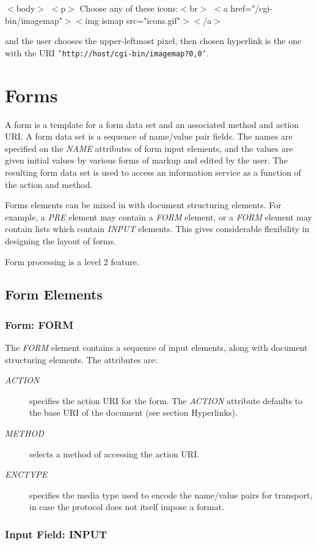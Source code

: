 $<$body$>$
$<$p$>$ Choose any of these icons:$<$br$>$
$<$a href="/cgi-bin/imagemap"$>$$<$img ismap src="icons.gif"$>$$<$/a$>$
\par 
and the user chooses the upper-leftmost pixel, then chosen
hyperlink is the one with the URI
{\tt `http://host/cgi-bin/imagemap?0,0'}.
\par \section*{Forms}\par 
A form is a template for a form data set and an associated method
and action URI.  A form data set is a sequence of name/value pair
fields.  The names are specified on the {\it NAME} attributes of form
input elements, and the values are given initial values by various
forms of markup and edited by the user.  The resulting form data set is
used to access an information service as a function of the action and
method.
\par \par 
Forms elements can be mixed in with document structuring
elements.  For example, a {\it PRE} element may contain a {\it FORM}
element, or a {\it FORM} element may contain lists which contain
{\it INPUT} elements.  This gives considerable flexibility in
designing the layout of forms.
\par \par 
Form processing is a level 2 feature.
\par \subsection*{Form Elements}\subsubsection*{Form:  FORM}\par 
The {\it FORM} element contains a sequence of input elements, along
with document structuring elements.  The attributes are:
\par \begin{description}\item[{\it ACTION}]
specifies the action URI for the form.  The {\it ACTION}
attribute defaults to the base URI of the document (see section Hyperlinks).
\item[{\it METHOD}]
selects a method of accessing the action URI.
\item[{\it ENCTYPE}]
specifies the media type used to encode the name/value
pairs for transport, in case the protocol does not itself impose a
format.
\end{description}\subsubsection*{Input Field:  INPUT}\par 
